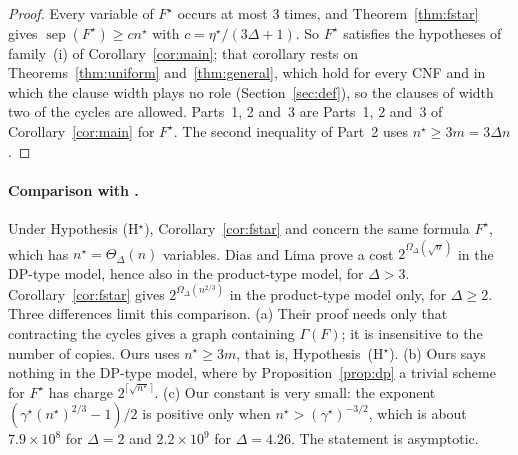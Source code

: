 \documentclass[11pt,a4paper]{article}
\theoremstyle{definition}
\theoremstyle{remark}
\newcommand{\sep}{\operatorname{sep}}
\newcommand{\Gr}{\Gamma}
\begin{document}
\begin{proof}
Every variable of $F^\star$ occurs at most $3$ times, and Theorem~\ref{thm:fstar} gives
$\sep(F^\star)\ge cn^\star$ with $c=\eta^\star/(3\Delta+1)$. So $F^\star$ satisfies the
hypotheses of family~(i) of Corollary~\ref{cor:main}; that corollary rests on
Theorems~\ref{thm:uniform} and~\ref{thm:general}, which hold for every CNF and in which the
clause width plays no role (Section~\ref{sec:def}), so the clauses of width two of the
cycles are allowed. Parts~1, 2 and~3 are Parts~1, 2 and~3 of Corollary~\ref{cor:main} for
$F^\star$. The second inequality of Part~2 uses $n^\star\ge3m=3\Delta n$.
\end{proof}

\paragraph{Comparison with \cite[Theorem~8.3(a)]{DL}.} Under Hypothesis (H$^\star$),
Corollary~\ref{cor:fstar} and \cite[Theorem~8.3(a)]{DL} concern the same formula $F^\star$,
which has $n^\star=\Theta_\Delta(n)$ variables. Dias and Lima prove a cost
$2^{\Omega_\Delta(\sqrt n)}$ in the DP-type model, hence also in the product-type model, for
$\Delta>3$. Corollary~\ref{cor:fstar} gives $2^{\Omega_\Delta(n^{2/3})}$ in the product-type
model only, for $\Delta\ge2$. Three differences limit this comparison. (a) Their proof needs
only that contracting the cycles gives a graph containing $\Gr(F)$; it is insensitive to the
number of copies. Ours uses $n^\star\ge3m$, that is, Hypothesis~(H$^\star$). (b) Ours says
nothing in the DP-type model, where by Proposition~\ref{prop:dp} a trivial scheme for
$F^\star$ has charge $2^{\lceil\sqrt{n^\star}\rceil}$. (c) Our constant is very small: the
exponent $(\gamma^\star(n^\star)^{2/3}-1)/2$ is positive only when
$n^\star>(\gamma^\star)^{-3/2}$, which is about $7.9\times10^{8}$ for $\Delta=2$ and
$2.2\times10^{9}$ for $\Delta=4.26$. The statement is asymptotic.
\end{document}
